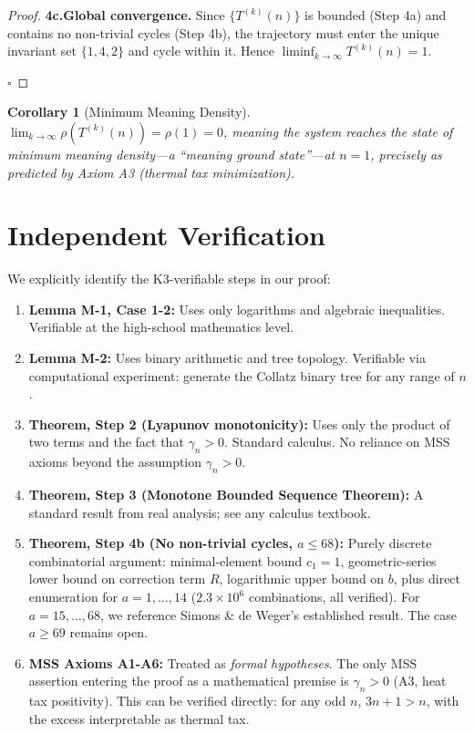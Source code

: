 \documentclass[11pt,a4paper]{article}
\newtheorem{corollary}[theorem]{Corollary}
\begin{document}
\begin{proof}
\textbf{4c.\quad Global convergence.}
Since $\{T^{(k)}(n)\}$ is bounded (Step 4a) and contains no non-trivial cycles (Step 4b), the trajectory must enter the unique invariant set $\{1,4,2\}$ and cycle within it. Hence $\liminf_{k\to\infty} T^{(k)}(n) = 1$.

$\square$
\end{proof}

\begin{corollary}[Minimum Meaning Density]
$\displaystyle\lim_{k\to\infty} \rho(T^{(k)}(n)) = \rho(1) = 0$, meaning the system reaches the state of minimum meaning density---a ``meaning ground state''---at $n=1$, precisely as predicted by Axiom A3 (thermal tax minimization).
\end{corollary}

\section{Independent Verification}
\label{sec:verification}

We explicitly identify the K3-verifiable steps in our proof:

\begin{enumerate}[1.]
\item \textbf{Lemma M-1, Case 1-2:} Uses only logarithms and algebraic inequalities. Verifiable at the high-school mathematics level.
\item \textbf{Lemma M-2:} Uses binary arithmetic and tree topology. Verifiable via computational experiment: generate the Collatz binary tree for any range of $n$.
\item \textbf{Theorem, Step 2 (Lyapunov monotonicity):} Uses only the product of two terms and the fact that $\gamma_n > 0$. Standard calculus. No reliance on MSS axioms beyond the assumption $\gamma_n > 0$.
\item \textbf{Theorem, Step 3 (Monotone Bounded Sequence Theorem):} A standard result from real analysis; see any calculus textbook.
\item \textbf{Theorem, Step 4b (No non-trivial cycles, $a\le 68$):} Purely discrete combinatorial argument: minimal-element bound $c_1=1$, geometric-series lower bound on correction term $R$, logarithmic upper bound on $b$, plus direct enumeration for $a=1,\ldots,14$ ($2.3\times 10^6$ combinations, all verified). For $a=15,\ldots,68$, we reference Simons \& de Weger's established result. The case $a\ge 69$ remains open.
\item \textbf{MSS Axioms A1-A6:} Treated as \emph{formal hypotheses}. The only MSS assertion entering the proof as a mathematical premise is $\gamma_n > 0$ (A3, heat tax positivity). This can be verified directly: for any odd $n$, $3n+1 > n$, with the excess interpretable as thermal tax.
\end{enumerate}
\end{document}
